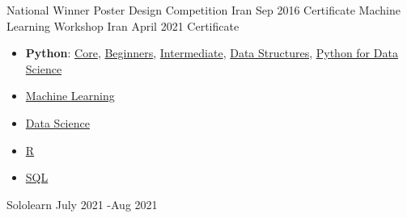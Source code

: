 



\begin{cvhonors}
	
	\cvhonor
	{National Winner} %
	{Poster Design Competition} %
	{Iran} %
	{Sep 2016} %
	\cvhonor
	{Certificate} %
	{Machine Learning Workshop} %
	{Iran} %
	{April 2021} %
	\cvhonor
	{Certificate} %
	{
      \begin{itemize} 
      	\item \textbf{Python}:
      	\href{https://www.sololearn.com/certificates/CT-B90QWVYC}{Core},
      	\href{https://www.sololearn.com/certificates/CT-DTWUD02P}{ Beginners}, 
      	\href{https://www.sololearn.com/certificates/CT-RN7YKMKK}{ Intermediate}, 
      	 \href{https://www.sololearn.com/certificates/CT-XAKXFXWR}{Data Structures}, 
      	 \href{https://www.sololearn.com/certificates/CT-NZNA4VQO}{Python for Data Science}
    	\item \href{https://www.sololearn.com/certificates/CT-U4BJLW5Q}{Machine Learning}
      	\item \href{https://www.sololearn.com/certificates/CT-EEQAJWBF}{Data Science}
      	\item \href{https://www.sololearn.com/certificates/CT-OPSKBMCY}{R}
      	\item \href{https://www.sololearn.com/certificates/CT-VK3EOARW	}{SQL}
     \end{itemize}
	} %
	{Sololearn} %
	{July 2021 -Aug 2021} %

\end{cvhonors}
